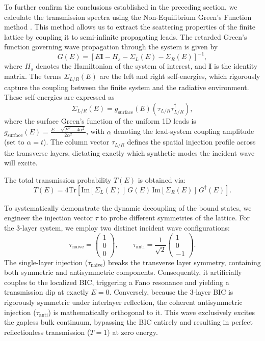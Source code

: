 \documentclass[twocolumn,english,prl,epsfig,rotate,showpacs,aps, superscriptaddress]{revtex4-2}
\begin{document}
{{To further confirm the conclusions established in the preceding section, we calculate the transmission spectra using the Non-Equilibrium Green's Function method \cite{datta1997electronic}. This method allows us to extract the scattering properties of the finite lattice by coupling it to semi-infinite propagating leads. The retarded Green's function governing wave propagation through the system is given by
\begin{equation}
G(E)= [E\mathbf{I} - H_{s}-\Sigma_L (E)-\Sigma_R (E)]^{-1},
\end{equation}
where $H_s$ denotes the Hamiltonian of the system of interest, and $\mathbf{I}$ is the identity matrix. The terms $\Sigma_{L/R}(E)$ are the left and right self-energies, which rigorously capture the coupling between the finite system and the radiative environment. These self-energies are expressed as
\begin{equation}
\Sigma_{L/R} (E) = g_{\mathrm{surface}}(E) \left( \tau_{L/R} \tau_{L/R}^\dagger \right),
\end{equation}
where the surface Green's function of the uniform 1D leads is $g_{\mathrm{surface}}(E) = \frac{E - \sqrt{E^2 - 4\alpha^2}}{2\alpha^2}$, with $\alpha$ denoting the lead-system coupling amplitude (set to $\alpha=t$). The column vector $\tau_{L/R}$ defines the spatial injection profile across the transverse layers, dictating exactly which synthetic modes the incident wave will excite.

The total transmission probability $T(E)$ is obtained via:
\begin{equation}
T(E) = 4 \mathrm{Tr} \left[ \mathrm{Im}[\Sigma_{L}(E)] \, G(E) \, \mathrm{Im}[\Sigma_{R}(E)] \, G^\dagger(E) \right].
\end{equation}

To systematically demonstrate the dynamic decoupling of the bound states, we engineer the injection vector $\tau$ to probe different symmetries of the lattice. For the 3-layer system, we employ two distinct incident wave configurations:
\begin{equation}
\tau_{\mathrm{naive}} = \begin{pmatrix} 1 \\ 0 \\ 0 \end{pmatrix}, \quad \quad \tau_{\mathrm{anti}} = \frac{1}{\sqrt{2}} \begin{pmatrix} 1 \\ 0 \\ -1 \end{pmatrix}.
\end{equation}
The single-layer injection ($\tau_{\mathrm{naive}}$) breaks the transverse layer symmetry, containing both symmetric and antisymmetric components. Consequently, it artificially couples to the localized BIC, triggering a Fano resonance and yielding a transmission dip at exactly $E=0$. Conversely, because the 3-layer BIC is rigorously symmetric under interlayer reflection, the coherent antisymmetric injection ($\tau_{\mathrm{anti}}$) is mathematically orthogonal to it. This wave exclusively excites the gapless bulk continuum, bypassing the BIC entirely and resulting in perfect reflectionless transmission ($T=1$) at zero energy.

}}
\end{document}
